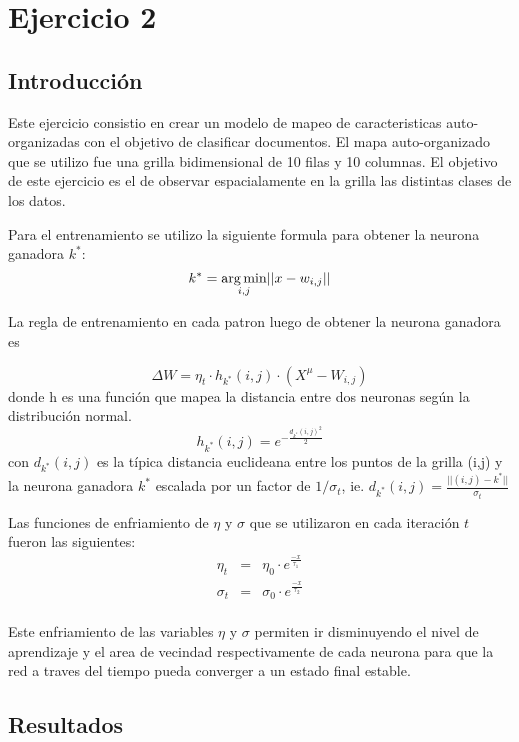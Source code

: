 \section{Ejercicio 2}

\subsection{Introducción}
Este ejercicio consistio en crear un modelo de mapeo de caracteristicas auto-organizadas con el objetivo de clasificar documentos. El mapa
auto-organizado que se utilizo fue una grilla bidimensional de 10 filas y 10 columnas. El objetivo de este ejercicio es el de observar espacialamente
en la grilla las distintas clases de los datos.

Para el entrenamiento se utilizo la siguiente formula para obtener la neurona ganadora $k^*$:
  \[
  k^* = \operatorname*{arg\,min}_{i,j} \lvert\lvert x-w_{i,j} \rvert\rvert
  \]

La regla de entrenamiento en cada patron luego de obtener la neurona ganadora es

\begin{equation}
	\Delta W = \eta_t \cdot h_{k^*}(i,j) \cdot (X^{\mu}-W_{i,j})
\end{equation}
donde h es una función que mapea la distancia entre dos neuronas
según la distribución normal.
\[
	h_{k^*}(i, j) = e^{-\frac{d_{k^*}(i,j)^2}{2}}
\]
con $d_{k^*}(i,j)$ es la típica distancia euclideana entre los puntos de la grilla (i,j) y
la neurona ganadora $k^*$ escalada por un factor de $1/\sigma_t$, ie.
$ d_{k^*}(i,j) = \frac{\lvert \lvert (i,j)-k^* \rvert \rvert}{\sigma_t} $

Las funciones de enfriamiento de $\eta$ y $\sigma$ que se utilizaron 
en cada iteración $t$ fueron las siguientes:
\[
  \begin{array}{ccc}
    \eta_t & = & \eta_0 \cdot e^{\frac{-x}{\tau_1}} \\
    \sigma_t & = & \sigma_0 \cdot e^{\frac{-x}{\tau_2}} \\
  \end{array}
\]

Este enfriamiento de las variables $\eta$ y $\sigma$ permiten ir disminuyendo
el nivel de aprendizaje y el area de vecindad respectivamente de cada neurona
para que la red a traves del tiempo pueda converger a un estado final estable.


\subsection{Resultados}
